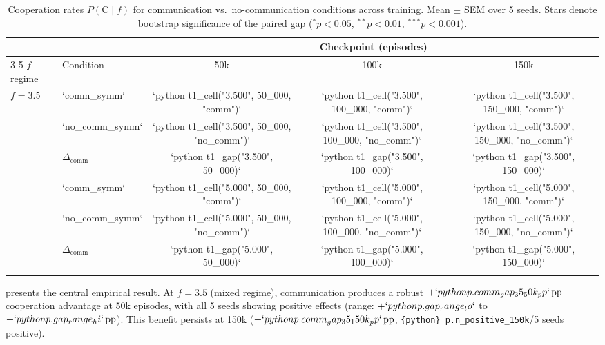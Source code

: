 \documentclass[
  10pt,
  letterpaper,
]{article}
\newcommand{\pcoopgiven}[1]{P(\text{C} \mid #1)}
\newcommand{\pp}{\text{\,pp}}
\newcommand{\commgap}{\Delta_{\text{comm}}}
\begin{document}
\begin{table}[t]
  \caption{Cooperation rates $\pcoopgiven{f}$ for communication vs.\ no-communication conditions across training. Mean $\pm$ SEM over 5 seeds. Stars denote bootstrap significance of the paired gap (${}^{*}p<0.05$, ${}^{**}p<0.01$, ${}^{***}p<0.001$).}
  
  \centering
  \small
  \begin{tabular}{llccc}
    \toprule
    & & \multicolumn{3}{c}{Checkpoint (episodes)} \\
    \cmidrule(lr){3-5}
    $f$ regime & Condition & 50k & 100k & 150k \\
    \midrule
    \multirow{3}{*}{$f\!=\!3.5$}

\begin{verbatim}
  & `comm_symm`     & `{python} t1_cell("3.500", 50_000, "comm")` & `{python} t1_cell("3.500", 100_000, "comm")` & `{python} t1_cell("3.500", 150_000, "comm")` \\
  & `no_comm_symm` & `{python} t1_cell("3.500", 50_000, "no_comm")` & `{python} t1_cell("3.500", 100_000, "no_comm")` & `{python} t1_cell("3.500", 150_000, "no_comm")` \\
  & $\commgap$              & `{python} t1_gap("3.500", 50_000)` & `{python} t1_gap("3.500", 100_000)` & `{python} t1_gap("3.500", 150_000)` \\
\end{verbatim}

    \midrule
    \multirow{3}{*}{$f\!=\!5.0$}

\begin{verbatim}
  & `comm_symm`     & `{python} t1_cell("5.000", 50_000, "comm")` & `{python} t1_cell("5.000", 100_000, "comm")` & `{python} t1_cell("5.000", 150_000, "comm")` \\
  & `no_comm_symm` & `{python} t1_cell("5.000", 50_000, "no_comm")` & `{python} t1_cell("5.000", 100_000, "no_comm")` & `{python} t1_cell("5.000", 150_000, "no_comm")` \\
  & $\commgap$              & `{python} t1_gap("5.000", 50_000)` & `{python} t1_gap("5.000", 100_000)` & `{python} t1_gap("5.000", 150_000)` \\
\end{verbatim}

    \bottomrule
  \end{tabular}
\end{table}

\citet{tab:comm_gap} presents the central empirical result. At
\(f = 3.5\) (mixed regime), communication produces a robust
\(+`{python} p.comm_gap_35_50k_pp`\pp\) cooperation advantage at 50k
episodes, with all 5 seeds showing positive effects (range:
\(+`{python} p.gap_range_lo`\) to \(+`{python} p.gap_range_hi`\pp\)).
This benefit persists at 150k (\(+`{python} p.comm_gap_35_150k_pp`\pp\),
\texttt{\{python\}\ p.n\_positive\_150k}/5 seeds positive).
\end{document}
